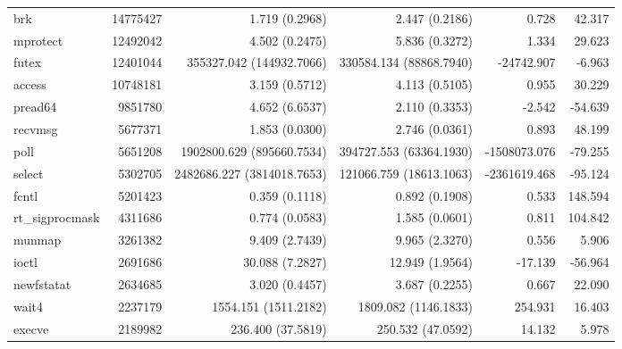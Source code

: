 \begin{longtable}{>{\ttfamily}lrrrrr}
                            brk &   14775427 &              1.719 (0.2968) &            2.447 (0.2186) &           0.728 &       42.317 \\
                       mprotect &   12492042 &              4.502 (0.2475) &            5.836 (0.3272) &           1.334 &       29.623 \\
                          futex &   12401044 &    355327.042 (144932.7066) &   330584.134 (88868.7940) &      -24742.907 &       -6.963 \\
                         access &   10748181 &              3.159 (0.5712) &            4.113 (0.5105) &           0.955 &       30.229 \\
                        pread64 &    9851780 &              4.652 (6.6537) &            2.110 (0.3353) &          -2.542 &      -54.639 \\
                        recvmsg &    5677371 &              1.853 (0.0300) &            2.746 (0.0361) &           0.893 &       48.199 \\
                           poll &    5651208 &   1902800.629 (895660.7534) &   394727.553 (63364.1930) &    -1508073.076 &      -79.255 \\
                         select &    5302705 &  2482686.227 (3814018.7653) &   121066.759 (18613.1063) &    -2361619.468 &      -95.124 \\
                          fcntl &    5201423 &              0.359 (0.1118) &            0.892 (0.1908) &           0.533 &      148.594 \\
                rt\_sigprocmask &    4311686 &              0.774 (0.0583) &            1.585 (0.0601) &           0.811 &      104.842 \\
                         munmap &    3261382 &              9.409 (2.7439) &            9.965 (2.3270) &           0.556 &        5.906 \\
                          ioctl &    2691686 &             30.088 (7.2827) &           12.949 (1.9564) &         -17.139 &      -56.964 \\
                     newfstatat &    2634685 &              3.020 (0.4457) &            3.687 (0.2255) &           0.667 &       22.090 \\
                          wait4 &    2237179 &        1554.151 (1511.2182) &      1809.082 (1146.1833) &         254.931 &       16.403 \\
                         execve &    2189982 &           236.400 (37.5819) &         250.532 (47.0592) &          14.132 &        5.978 \\

\end{longtable}
